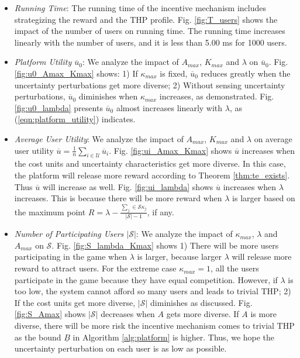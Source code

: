 \documentclass{IEEEtran}
\begin{document}
\begin{itemize}
\item \emph{Running Time}: The running time of the incentive mechanism includes strategizing the reward and the THP profile. Fig. \ref{fig:T_users} shows the impact of the number of users on running time. The running time increases linearly with the number of users, and it is less than 5.00 ms for 1000 users.

\item \emph{Platform Utility $\overline{u}_0$}: We analyze the impact of $A_{max}$, $K_{max}$ and $\lambda$ on $\overline{u}_0$. Fig. \ref{fig:u0_Amax_Kmax} shows: 1) If $\kappa_{max}$ is fixed, $\overline{u}_0$ reduces greatly when the uncertainty perturbations get more diverse; 2) Without sensing {\color{black}uncertainty perturbations}, $\overline{u}_0$ diminishes when $\kappa_{max}$ increases, as \cite{yang:crowdsourcing} demonstrated. Fig. \ref{fig:u0_lambda} presents $\overline{u}_0$ almost increases linearly with $\lambda$, as (\ref{eqn:platform_utility}) indicates.

\item \emph{Average User Utility}: We analyze the impact of $A_{max}$, $K_{max}$ and $\lambda$ on average user utility $\overline{u}=\frac{1}{n}\sum_{i\in\mathcal{U}}\overline{u}_i$. Fig. \ref{fig:ui_Amax_Kmax} shows $\overline{u}$ increases when the cost units and {\color{black}uncertainty characteristics} get more diverse. In this case, the platform will release more reward according to Theorem \ref{thm:te_exists}. Thus $\overline{u}$ will increase as well. Fig. \ref{fig:ui_lambda} shows $\overline{u}$ increases when $\lambda$ increases. This is because there will be more reward when $\lambda$ is larger based on the maximum point $R=\lambda-\frac{\sum_j\in\mathcal{S}\kappa_j}{|\mathcal{S}|-1}$, if any.

\item \emph{Number of Participating Users $|\mathcal{S}|$}: We analyze the impact of $\kappa_{max}$, $\lambda$ and $A_{max}$ on $\mathcal{S}$. Fig. \ref{fig:S_lambda_Kmax} shows 1) There will be more users participating in the game when $\lambda$ is larger, because larger $\lambda$ will release more reward to attract users. For the extreme case $\kappa_{max}=1$, all the users participate in the game because they have equal competition. However, if $\lambda$ is too low, the system cannot afford so many users and leads to trivial THP; 2) If the cost units get more diverse, $|\mathcal{S}|$ diminishes as \cite{yang:crowdsourcing} discussed. Fig. \ref{fig:S_Amax} shows $|\mathcal{S}|$ decreases when $A$ gets more diverse. If $A$ is more diverse, there will be more risk the incentive mechanism comes to trivial THP as the bound $\underline{B}$ in Algorithm \ref{alg:platform} is higher. Thus, we hope the {\color{black}uncertainty perturbation on} each user is as low as possible.

\end{itemize}
\end{document}
